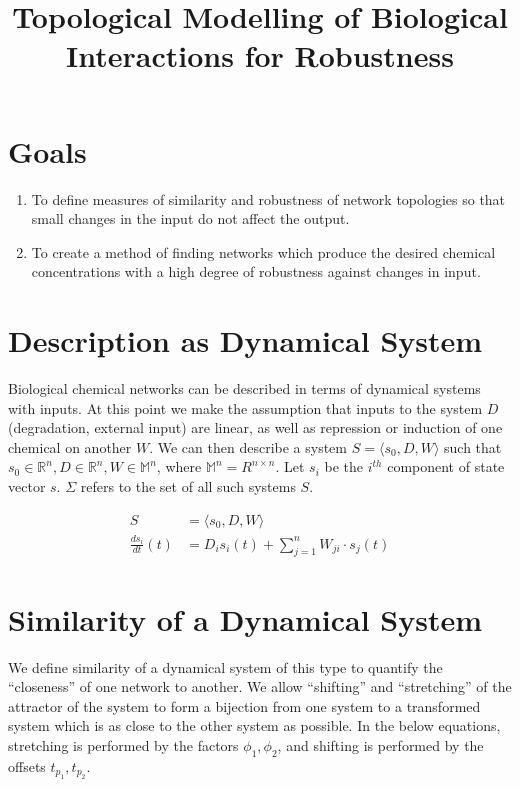 \documentclass{article}
\title{Topological Modelling of Biological Interactions for Robustness}
\date{}
\begin{document}
\maketitle
\vspace{-50pt}

\section{Goals}
\begin{enumerate}
\item To define measures of similarity and robustness of network topologies so that small changes in the input do not affect the output.
\item To create a method of finding networks which produce the desired chemical concentrations with a high degree of robustness against changes in input.
\end{enumerate}

\section{Description as Dynamical System}
Biological chemical networks can be described in terms of dynamical systems with inputs. At this point we make the assumption that inputs to the system $D$ (degradation, external input) are linear, as well as repression or induction of one chemical on another $W$. We can then describe a system $S = \langle s_0, D, W \rangle$ such that $s_0 \in \mathbb{R}^n, D \in \mathbb{R}^n, W \in \mathbb{M}^n$, where $\mathbb{M}^n = R^{n \times n}$. Let $s_i$ be the $i^{th}$ component of state vector $s$. $\Sigma$ refers to the set of all such systems $S$.

\begin{align}
  S &= \langle s_0, D, W \rangle \label{system-defn} \\
  \frac{ds_i}{dt}(t) &= D_i s_i(t) + \sum_{j = 1}^n W_{ji} \cdot s_j(t) \label{system-diffeq}
\end{align}

\section{Similarity of a Dynamical System} \label{similarity}
We define similarity of a dynamical system of this type to quantify the ``closeness'' of one network to another. We allow ``shifting'' and ``stretching'' of the attractor of the system to form a bijection from one system to a transformed system which is as close to the other system as possible. In the below equations, stretching is performed by the factors $\phi_1, \phi_2$, and shifting is performed by the offsets $t_{p_1}, t_{p_2}$.
\end{document}
